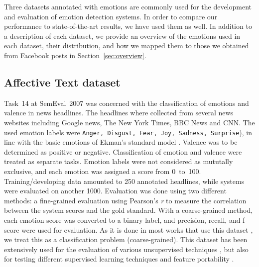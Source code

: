 \documentclass[11pt]{article}
\begin{document}
Three datasets annotated with emotions are commonly used for the development and evaluation of emotion detection systems. In order to compare our performance to state-of-the-art results, we have used them as well. In addition to a description of each dataset, we provide an overview of the emotions used in each dataset, their distribution, and how we mapped them to those we obtained from Facebook posts in Section~\ref{sec:overview}.

\subsection{Affective Text dataset}
\label{sec:data:affect}
Task~14 at SemEval~2007  \cite{strapparava2007semeval} was concerned with the classification of emotions and valence in news headlines. The headlines where collected from several news websites including Google news,  The New York Times, BBC News and CNN. The used emotion labels were \texttt{Anger, Disgust, Fear, Joy, Sadness, Surprise}), in line with the basic emotions of Ekman's standard model \cite{ekman1992argument}. Valence was to be determined as positive or negative. Classification of emotion and valence were treated as separate tasks. 
Emotion labels were not considered as mututally exclusive, and each emotion was assigned a score from 0~to~100. Training/developing data amounted to 250 annotated headlines, while systems were evaluated on another 1000. Evaluation was done using two different methods: a fine-grained evaluation using Pearson's \textit{r}  to measure the correlation between the system scores and the gold standard. With a coarse-grained method, each emotion score was converted to a binary label, and precision, recall, and f-score were used for evaluation. As it is done in most works that use this dataset \cite{chaffar2011using,calvo2013emotions,kim2010evaluation}, we treat this as a classification problem (coarse-grained).  This dataset has been extensively used for the evaluation of various unsupervised techniques \cite{strapparava2008learning}, but also for testing different supervised learning techniques and feature portability \cite{mohammad:2012:NAACL-HLT}.

%
%
\end{document}
